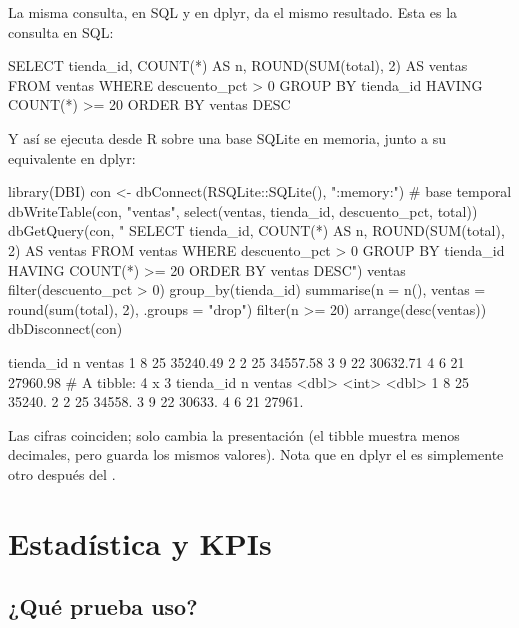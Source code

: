 La misma consulta, en SQL y en dplyr, da el mismo resultado. Esta es la
consulta en SQL:

\begin{sqlcode}
SELECT tienda_id, COUNT(*) AS n, ROUND(SUM(total), 2) AS ventas
FROM ventas
WHERE descuento_pct > 0
GROUP BY tienda_id
HAVING COUNT(*) >= 20
ORDER BY ventas DESC
\end{sqlcode}

Y así se ejecuta desde R sobre una base SQLite en memoria, junto a su
equivalente en dplyr:

\begin{rcode}
library(DBI)
con <- dbConnect(RSQLite::SQLite(), ":memory:")   # base temporal
dbWriteTable(con, "ventas", select(ventas, tienda_id, descuento_pct, total))
dbGetQuery(con, "
  SELECT tienda_id, COUNT(*) AS n, ROUND(SUM(total), 2) AS ventas
  FROM ventas
  WHERE descuento_pct > 0
  GROUP BY tienda_id
  HAVING COUNT(*) >= 20
  ORDER BY ventas DESC")
ventas %
  filter(descuento_pct > 0) %
  group_by(tienda_id) %
  summarise(n = n(), ventas = round(sum(total), 2), .groups = "drop") %
  filter(n >= 20) %
  arrange(desc(ventas))
dbDisconnect(con)
\end{rcode}
\begin{rsalida}
  tienda_id  n   ventas
1         8 25 35240.49
2         2 25 34557.58
3         9 22 30632.71
4         6 21 27960.98
# A tibble: 4 x 3
  tienda_id     n ventas
      <dbl> <int>  <dbl>
1         8    25 35240.
2         2    25 34558.
3         9    22 30633.
4         6    21 27961.
\end{rsalida}

Las cifras coinciden; solo cambia la presentación (el tibble muestra menos
decimales, pero guarda los mismos valores). Nota que en dplyr el
 es simplemente otro  después del
.

\section{Estadística y KPIs}
\label{sec:ap-b-estadistica}

\subsection{¿Qué prueba uso?}

